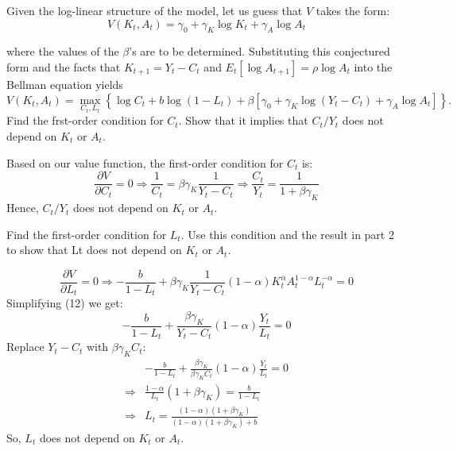\begin{solution}
    
\end{solution}

\begin{problem}[2]
    Given the log-linear structure of the model, let us guess that $V$ takes the form:
    $$V\left(K_t,A_t\right)=\gamma_0+\gamma_K\log K_t+\gamma_A\log A_t$$

    where the values of the $\beta$'s are to be determined. Substituting this conjectured form and the facts
    that $K_{t+1}=Y_t-C_t$ and $E_t\left[\log A_{t+1}\right]=\rho\log A_t$ into the Bellman equation yields
    $$V\left(K_t,A_t\right)=\max_{C_t,L_t}\left\{\log C_t+b\log\left(1-L_t\right)+\beta\left[\gamma_0+\gamma_K\log\left(Y_t-C_t\right)+\gamma_A\log A_t\right]\right\}.$$
    Find the frst-order condition for $C_t.$ Show that it implies that $C_t/Y_t$ does not depend on $K_t$ or $A_t.$
\end{problem}

\begin{solution}
    Based on our value function, the first-order condition for $C_t$ is:
    \begin{equation}
        \frac{\partial V}{\partial C_t} = 0 \Rightarrow \frac{1}{C_t} = \beta \gamma_K \frac{1}{Y_t - C_t} \Rightarrow \frac{C_t}{Y_t} = \frac{1}{1 + \beta \gamma_K}        
    \end{equation}
    Hence, $C_t/Y_t$ does not depend on $K_t$ or $A_t$.
\end{solution}

\begin{problem}[3]
    Find the first-order condition for $L_t.$ Use this condition and the result in part 2 to show that Lt
    does not depend on $K_t$ or $A_t$.
\end{problem}

\begin{solution}
    \begin{equation}
        \frac{\partial V}{\partial L_t} = 0 \Rightarrow -\frac{b}{1-L_t} + \beta \gamma_K \frac{1}{Y_t - C_t}(1-\alpha ) K_t^{\alpha }A_t^{1-\alpha }L_t^{-\alpha }   = 0
    \end{equation}
    Simplifying (12) we get:
    \begin{equation}
        -\frac{b}{1-L_t} + \frac{\beta \gamma_K}{Y_t - C_t}(1-\alpha ) \frac{Y_t}{L_t}= 0
    \end{equation}
    Replace $Y_t - C_t$ with $\beta \gamma_K C_t$:
    \begin{align*}
        &-\frac{b}{1-L_t} + \frac{\beta \gamma_K}{\beta \gamma_K C_t}(1-\alpha ) \frac{Y_t}{L_t}= 0 \\
        \Rightarrow & \frac{1-\alpha}{L_t} (1 + \beta \gamma_K) = \frac{b}{1-L_t} \\
        \Rightarrow & L_t = \frac{(1-\alpha)(1 + \beta \gamma_K)}{(1-\alpha)(1 + \beta \gamma_K) + b}
    \end{align*}
    So, $L_t$ does not depend on $K_t$ or $A_t$.
\end{solution}

